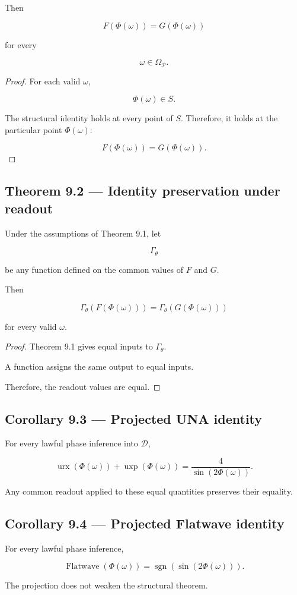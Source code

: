 \documentclass[11pt,oneside,openany]{book}
\newcommand{\PCsubsection}[1]{%
  \subsection*{#1}%
}
\begin{document}
Then

\[
\boxed{ F(\Phi(\omega)) = G(\Phi(\omega)) }
\]

for every

\[
\omega\in\Omega_{\mathcal P}.
\]

\begin{proof}
For each valid \(\omega\),

\[
\Phi(\omega)\in S.
\]

The structural identity holds at every point of \(S\). Therefore, it holds at the particular point \(\Phi(\omega)\):

\[
F(\Phi(\omega)) = G(\Phi(\omega)).
\]

\end{proof}

\PCsubsection{Theorem 9.2 --- Identity preservation under readout}

Under the assumptions of Theorem 9.1, let

\[
\Gamma_\theta
\]

be any function defined on the common values of \(F\) and \(G\).

Then

\[
\boxed{ \Gamma_\theta(F(\Phi(\omega))) = \Gamma_\theta(G(\Phi(\omega))) }
\]

for every valid \(\omega\).

\begin{proof}
Theorem 9.1 gives equal inputs to \(\Gamma_\theta\).

A function assigns the same output to equal inputs.

Therefore, the readout values are equal.

\end{proof}

\PCsubsection{Corollary 9.3 --- Projected UNA identity}

For every lawful phase inference into \(\mathcal D\),

\[
\operatorname{urx}(\Phi(\omega)) + \operatorname{uxp}(\Phi(\omega)) = \frac4{\sin(2\Phi(\omega))}.
\]

Any common readout applied to these equal quantities preserves their equality.

\PCsubsection{Corollary 9.4 --- Projected Flatwave identity}

For every lawful phase inference,

\[
\operatorname{Flatwave}(\Phi(\omega)) = \operatorname{sgn} \left( \sin(2\Phi(\omega)) \right).
\]

The projection does not weaken the structural theorem.
\end{document}
